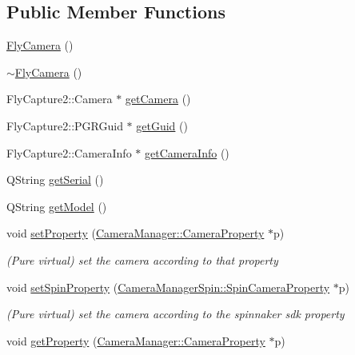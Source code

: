 \subsection*{Public Member Functions}
\begin{DoxyCompactItemize}
\item 
\mbox{\hyperlink{class_fly_camera_afd1a0ac89dd9cb35a4695758e066c766}{Fly\+Camera}} ()
\item 
\mbox{\hyperlink{class_fly_camera_a8968e02633b3e7f1c9da293cac0b92ba}{$\sim$\+Fly\+Camera}} ()
\item 
Fly\+Capture2\+::\+Camera $\ast$ \mbox{\hyperlink{class_fly_camera_acb0c1380011ed78ce6fcd5ccfd7073f0}{get\+Camera}} ()
\item 
Fly\+Capture2\+::\+P\+G\+R\+Guid $\ast$ \mbox{\hyperlink{class_fly_camera_ab6e8035822f813a32544ffec4cded890}{get\+Guid}} ()
\item 
Fly\+Capture2\+::\+Camera\+Info $\ast$ \mbox{\hyperlink{class_fly_camera_a999b2d2f7e13245e8f00a1f8df0f553a}{get\+Camera\+Info}} ()
\item 
Q\+String \mbox{\hyperlink{class_fly_camera_a2f6857dd2270d473f3d4ecb590b5dcab}{get\+Serial}} ()
\item 
Q\+String \mbox{\hyperlink{class_fly_camera_ae161d0e4afa9abfc87aec13263d6cadb}{get\+Model}} ()
\item 
void \mbox{\hyperlink{class_fly_camera_ad9d4102cab167f0d5739b2af808c43ee}{set\+Property}} (\mbox{\hyperlink{class_camera_manager_1_1_camera_property}{Camera\+Manager\+::\+Camera\+Property}} $\ast$p)
\begin{DoxyCompactList}\small\item\em (Pure virtual) set the camera according to that property \end{DoxyCompactList}\item 
void \mbox{\hyperlink{class_fly_camera_a5d3b0d4395ec7654e34d56d7f13a541a}{set\+Spin\+Property}} (\mbox{\hyperlink{class_camera_manager_spin_1_1_spin_camera_property}{Camera\+Manager\+Spin\+::\+Spin\+Camera\+Property}} $\ast$p)
\begin{DoxyCompactList}\small\item\em (Pure virtual) set the camera according to the spinnaker sdk property \end{DoxyCompactList}\item 
void \mbox{\hyperlink{class_fly_camera_a507fb4841e3b3bdbbb0a1e0d158d7340}{get\+Property}} (\mbox{\hyperlink{class_camera_manager_1_1_camera_property}{Camera\+Manager\+::\+Camera\+Property}} $\ast$p)
\item 

\end{DoxyCompactItemize}

